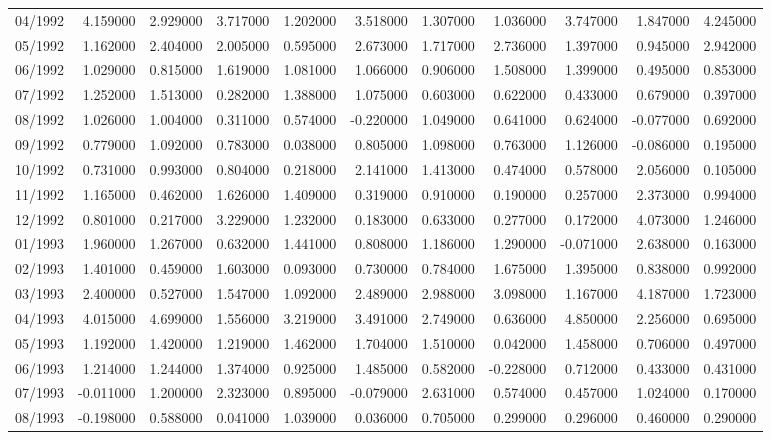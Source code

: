 \begin{tabular}{lrrrrrrrrrr}
04/1992 & 4.159000 & 2.929000 & 3.717000 & 1.202000 & 3.518000 & 1.307000 & 1.036000 & 3.747000 & 1.847000 & 4.245000 \\
05/1992 & 1.162000 & 2.404000 & 2.005000 & 0.595000 & 2.673000 & 1.717000 & 2.736000 & 1.397000 & 0.945000 & 2.942000 \\
06/1992 & 1.029000 & 0.815000 & 1.619000 & 1.081000 & 1.066000 & 0.906000 & 1.508000 & 1.399000 & 0.495000 & 0.853000 \\
07/1992 & 1.252000 & 1.513000 & 0.282000 & 1.388000 & 1.075000 & 0.603000 & 0.622000 & 0.433000 & 0.679000 & 0.397000 \\
08/1992 & 1.026000 & 1.004000 & 0.311000 & 0.574000 & -0.220000 & 1.049000 & 0.641000 & 0.624000 & -0.077000 & 0.692000 \\
09/1992 & 0.779000 & 1.092000 & 0.783000 & 0.038000 & 0.805000 & 1.098000 & 0.763000 & 1.126000 & -0.086000 & 0.195000 \\
10/1992 & 0.731000 & 0.993000 & 0.804000 & 0.218000 & 2.141000 & 1.413000 & 0.474000 & 0.578000 & 2.056000 & 0.105000 \\
11/1992 & 1.165000 & 0.462000 & 1.626000 & 1.409000 & 0.319000 & 0.910000 & 0.190000 & 0.257000 & 2.373000 & 0.994000 \\
12/1992 & 0.801000 & 0.217000 & 3.229000 & 1.232000 & 0.183000 & 0.633000 & 0.277000 & 0.172000 & 4.073000 & 1.246000 \\
01/1993 & 1.960000 & 1.267000 & 0.632000 & 1.441000 & 0.808000 & 1.186000 & 1.290000 & -0.071000 & 2.638000 & 0.163000 \\
02/1993 & 1.401000 & 0.459000 & 1.603000 & 0.093000 & 0.730000 & 0.784000 & 1.675000 & 1.395000 & 0.838000 & 0.992000 \\
03/1993 & 2.400000 & 0.527000 & 1.547000 & 1.092000 & 2.489000 & 2.988000 & 3.098000 & 1.167000 & 4.187000 & 1.723000 \\
04/1993 & 4.015000 & 4.699000 & 1.556000 & 3.219000 & 3.491000 & 2.749000 & 0.636000 & 4.850000 & 2.256000 & 0.695000 \\
05/1993 & 1.192000 & 1.420000 & 1.219000 & 1.462000 & 1.704000 & 1.510000 & 0.042000 & 1.458000 & 0.706000 & 0.497000 \\
06/1993 & 1.214000 & 1.244000 & 1.374000 & 0.925000 & 1.485000 & 0.582000 & -0.228000 & 0.712000 & 0.433000 & 0.431000 \\
07/1993 & -0.011000 & 1.200000 & 2.323000 & 0.895000 & -0.079000 & 2.631000 & 0.574000 & 0.457000 & 1.024000 & 0.170000 \\
08/1993 & -0.198000 & 0.588000 & 0.041000 & 1.039000 & 0.036000 & 0.705000 & 0.299000 & 0.296000 & 0.460000 & 0.290000 \\

\end{tabular}

